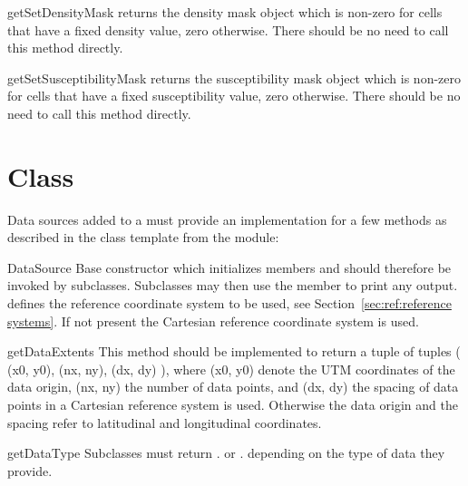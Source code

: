 \begin{methoddesc}[DomainBuilder]{getSetDensityMask}{}
returns the density mask \Data object which is non-zero for cells that have a
fixed density value, zero otherwise.
There should be no need to call this method directly.
\end{methoddesc}

\begin{methoddesc}[DomainBuilder]{getSetSusceptibilityMask}{}
returns the susceptibility mask \Data object which is non-zero for cells that
have a fixed susceptibility value, zero otherwise.
There should be no need to call this method directly.
\end{methoddesc}

\section{ Class}\label{sec:ref:DataSource}

Data sources added to a  must provide an implementation for
a few methods as described in the class template  from
the  module:

\begin{classdesc}{DataSource}{}
Base constructor which initializes members and should therefore be invoked by
subclasses. Subclasses may then use the member  to print any
output.  defines the reference coordinate system to be used, see Section~\ref{sec:ref:reference systems}.
If not present the Cartesian reference coordinate system is used.
\end{classdesc}

\begin{methoddesc}[DataSource]{getDataExtents}{}
This method should be implemented to return a tuple of tuples
( (x0, y0), (nx, ny), (dx, dy) ), where (x0, y0) denote the UTM coordinates of
the data origin, (nx, ny) the number of data points, and (dx, dy) the spacing
of data points in a Cartesian reference system is used. Otherwise 
the data origin and the spacing refer to latitudinal and longitudinal coordinates.
\end{methoddesc}

\begin{methoddesc}[DataSource]{getDataType}{}
Subclasses must return . or
. depending on the type of data they provide.
\end{methoddesc}

